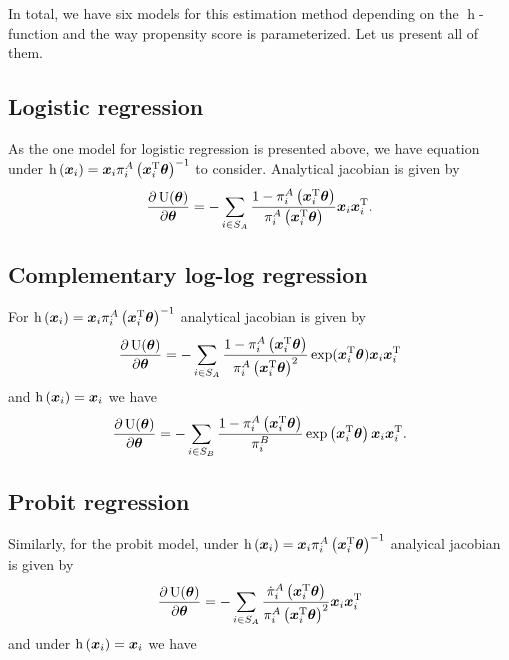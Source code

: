 \documentclass[
  letterpaper,
  DIV=11,
  numbers=noendperiod]{scrreprt}
\begin{document}
In total, we have six models for this estimation method depending on the
\(\operatorname{h}\)-function and the way propensity score is
parameterized. Let us present all of them.

\subsection{Logistic regression}\label{logistic-regression-1}

As the one model for logistic regression is presented above, we have
equation under
\(\operatorname{h}\left(\boldsymbol{x}_i\right) = \boldsymbol{x}_i \pi_i^A\left(\boldsymbol{x}_i^{\mathrm{T}} \boldsymbol{\theta} \right)^{-1}\)
to consider. Analytical jacobian is given by \[
    \frac{\partial \operatorname{U}(\boldsymbol{\theta})}{\partial \boldsymbol{\theta}} = -\sum_{i \in S_A} \frac{1 - \pi_i^A\left(\boldsymbol{x}_i^{\mathrm{T}} \boldsymbol{\theta} \right)}{\pi_i^A\left(\boldsymbol{x}_i^{\mathrm{T}} \boldsymbol{\theta} \right)} \boldsymbol{x}_i \boldsymbol{x}_i^{\mathrm{T}}.
\]

\subsection{Complementary log-log
regression}\label{complementary-log-log-regression-1}

For
\(\operatorname{h}\left(\boldsymbol{x}_i\right) = \boldsymbol{x}_i \pi_i^A\left(\boldsymbol{x}_i^{\mathrm{T}} \boldsymbol{\theta} \right)^{-1}\)
analytical jacobian is given by \[
    \frac{\partial \operatorname{U}(\boldsymbol{\theta})}{\partial \boldsymbol{\theta}} = - \sum_{i \in S_A} \frac{1 - \pi_i^A\left(\boldsymbol{x}_i^{\mathrm{T}} \boldsymbol{\theta} \right)}{\pi_i^A\left(\boldsymbol{x}_i^{\mathrm{T}} \boldsymbol{\theta} \right)^2} \exp(\boldsymbol{x}_i^{\mathrm{T}} \boldsymbol{\theta}) \boldsymbol{x}_i \boldsymbol{x}_i^{\mathrm{T}}
\] and \(\operatorname{h}\left(\boldsymbol{x}_i\right) = \boldsymbol{x}_i\) we have \[
    \frac{\partial \operatorname{U}(\boldsymbol{\theta})}{\partial \boldsymbol{\theta}} = - \sum_{i \in S_B} \frac{1 - \pi_i^A\left(\boldsymbol{x}_i^{\mathrm{T}} \boldsymbol{\theta} \right)}{\pi_i^B} \exp \left(\boldsymbol{x}_i^\mathrm{T} \boldsymbol{\theta}\right) \boldsymbol{x}_i \boldsymbol{x}_i^{\mathrm{T}}.
\]

\subsection{Probit regression}\label{probit-regression-1}

Similarly, for the probit model, under
\(\operatorname{h}\left(\boldsymbol{x}_i\right) = \boldsymbol{x}_i \pi_i^A\left(\boldsymbol{x}_i^{\mathrm{T}} \boldsymbol{\theta} \right)^{-1}\)
analyical jacobian is given by \[
    \frac{\partial \operatorname{U}(\boldsymbol{\theta})}{\partial \boldsymbol{\theta}} = - \sum_{i \in S_A} \frac{\dot{\pi}_i^A\left(\boldsymbol{x}_i^{\mathrm{T}} \boldsymbol{\theta} \right)}{\pi_i^A\left(\boldsymbol{x}_i^{\mathrm{T}} \boldsymbol{\theta} \right)^2} \boldsymbol{x}_i \boldsymbol{x}_i^{\mathrm{T}}
\] and under \(\operatorname{h}\left(\boldsymbol{x}_i\right) = \boldsymbol{x}_i\) we have
\end{document}

